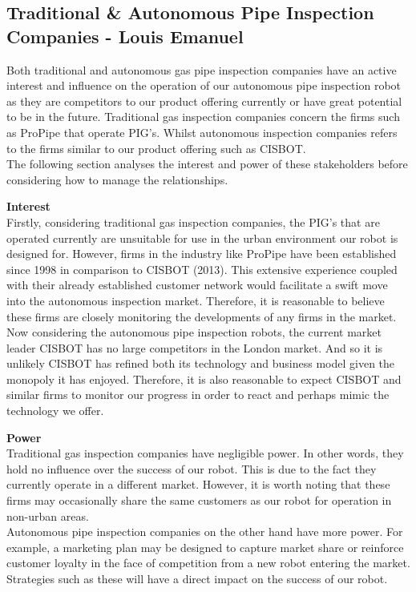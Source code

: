 \documentclass[11pt]{article}		%
\begin{document}
		
		\subsection[Traditional  \& Autonomous Pipe Inspection Companies]{Traditional \& Autonomous Pipe Inspection Companies - Louis Emanuel}
            Both traditional and autonomous gas pipe inspection companies have an active interest and influence on the operation of our autonomous pipe inspection robot as they are competitors to our product offering currently or have great potential to be in the future. Traditional gas inspection companies concern the firms such as ProPipe that operate PIG’s. Whilst autonomous inspection companies refers to the firms similar to our product offering such as CISBOT. \\
            \hspace*{3ex}The following section analyses the interest and power of these stakeholders before considering how to manage the relationships.
            
            \textbf{Interest}\\
            Firstly, considering traditional gas inspection companies, the PIG’s that are operated currently are unsuitable for use in the urban environment our robot is designed for. However, firms in the industry like ProPipe have been established since 1998 in comparison to CISBOT (2013). This extensive experience coupled with their already established customer network would facilitate a swift move into the autonomous inspection market. Therefore, it is reasonable to believe these firms are closely monitoring the developments of any firms in the market. \\
            \hspace*{3ex}Now considering the autonomous pipe inspection robots, the current market leader CISBOT has no large competitors in the London market. And so it is unlikely CISBOT has refined both its technology and business model given the monopoly it has enjoyed. Therefore, it is also reasonable to expect CISBOT and similar firms to monitor our progress in order to react and perhaps mimic the technology we offer. 
            
            \textbf{Power}\\
            Traditional gas inspection companies have negligible power. In other words, they hold no influence over the success of our robot. This is due to the fact they currently operate in a different market. However, it is worth noting that these firms may occasionally share the same customers as our robot for operation in non-urban areas. \\
            \hspace*{3ex}Autonomous pipe inspection companies on the other hand have more power. For example, a marketing plan may be designed to capture market share or reinforce customer loyalty in the face of competition from a new robot entering the market. Strategies such as these will have a direct impact on the success of our robot. 
            
\end{document}
